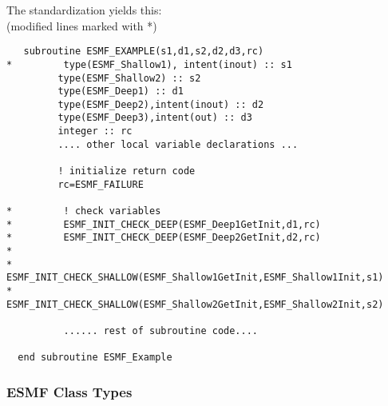 The standardization yields this:\\
(modified lines marked with *)

\begin{verbatim}
   subroutine ESMF_EXAMPLE(s1,d1,s2,d2,d3,rc)
*         type(ESMF_Shallow1), intent(inout) :: s1
         type(ESMF_Shallow2) :: s2
         type(ESMF_Deep1) :: d1
         type(ESMF_Deep2),intent(inout) :: d2
         type(ESMF_Deep3),intent(out) :: d3
         integer :: rc
         .... other local variable declarations ...

         ! initialize return code
         rc=ESMF_FAILURE

*         ! check variables
*         ESMF_INIT_CHECK_DEEP(ESMF_Deep1GetInit,d1,rc)
*         ESMF_INIT_CHECK_DEEP(ESMF_Deep2GetInit,d2,rc)
*
*         ESMF_INIT_CHECK_SHALLOW(ESMF_Shallow1GetInit,ESMF_Shallow1Init,s1)
*         ESMF_INIT_CHECK_SHALLOW(ESMF_Shallow2GetInit,ESMF_Shallow2Init,s2)

          ...... rest of subroutine code....

  end subroutine ESMF_Example
\end{verbatim}

\subsubsection{ESMF Class Types}\label{is:typelist}


